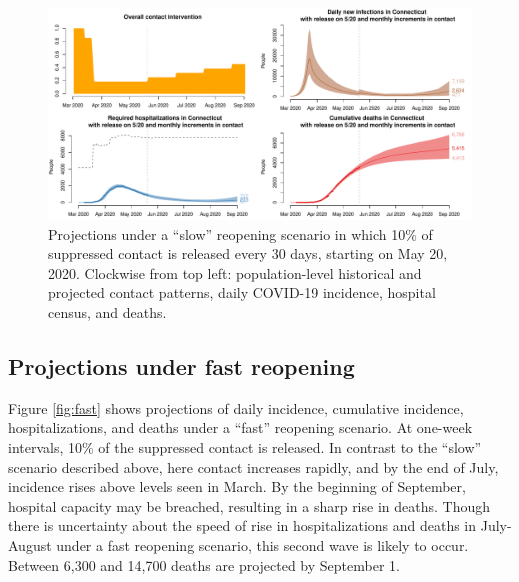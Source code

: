 \documentclass[11pt]{article}
\begin{document}
\begin{figure}
\centering
\includegraphics[width=\textwidth]{figures/slow.pdf}
\caption{Projections under a ``slow'' reopening scenario in which 10\% of suppressed contact is released every 30 days, starting on May 20, 2020. Clockwise from top left: population-level historical and projected contact patterns, daily COVID-19 incidence, hospital census, and deaths. }

\label{fig:slow}
\end{figure}



\subsection*{Projections under fast reopening} 

Figure \ref{fig:fast} shows projections of daily incidence, cumulative incidence, hospitalizations, and deaths under a ``fast'' reopening scenario. At one-week intervals, 10\% of the suppressed contact is released.   In contrast to the ``slow'' scenario described above, here contact increases rapidly, and by the end of July, incidence rises above levels seen in March.  By the beginning of September, hospital capacity may be breached, resulting in a sharp rise in deaths. Though there is uncertainty about the speed of rise in hospitalizations and deaths in July-August under a fast reopening scenario, this second wave is likely to occur. Between 6,300 and 14,700 deaths are projected by September 1. 
\end{document}
